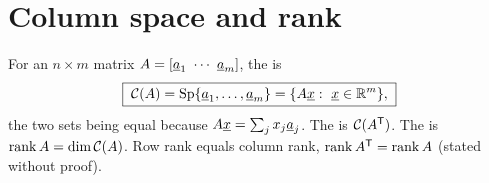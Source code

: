 \section{Column space and rank}

\begin{definition}
For an $n\times m$ matrix $A=[\vect{a}_1\ \cdots\ \vect{a}_m]$, the  is
\[
  \boxed{\;\C(A)=\Sp\{\vect{a}_1,\dots,\vect{a}_m\}=\{A\vect{x}:\ \vect{x}\in\R^m\},\;}
\]
the two sets being equal because $A\underline{x}=\sum_jx_j\underline{a}_j$. The  is $\mathcal{C}(A^{\mathsf{T}})$. The  is $\operatorname{rank} A=\dim\mathcal{C}(A)$. Row rank equals column rank, $\operatorname{rank} A^{\mathsf{T}}=\operatorname{rank} A$ (stated without proof).
\end{definition}

